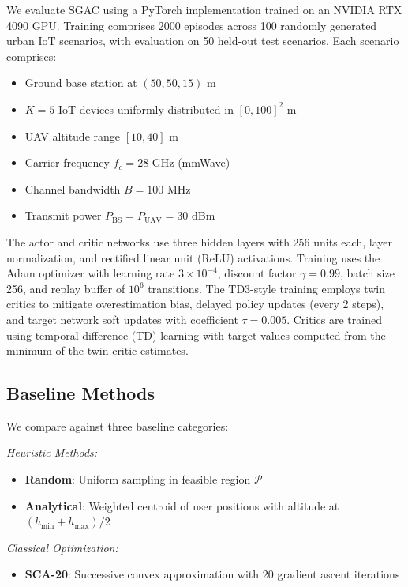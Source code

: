 \documentclass[journal]{IEEEtran}
\begin{document}
We evaluate SGAC using a PyTorch implementation trained on an NVIDIA RTX 4090 GPU. Training comprises 2000 episodes across 100 randomly generated urban IoT scenarios, with evaluation on 50 held-out test scenarios. Each scenario comprises:
\begin{itemize}
\item Ground base station at $(50, 50, 15)$ m
\item $K = 5$ IoT devices uniformly distributed in $[0, 100]^2$ m
\item UAV altitude range $[10, 40]$ m
\item Carrier frequency $f_c = 28$ GHz (mmWave)
\item Channel bandwidth $B = 100$ MHz
\item Transmit power $P_{\text{BS}} = P_{\text{UAV}} = 30$ dBm
\end{itemize}

The actor and critic networks use three hidden layers with 256 units each, layer normalization, and rectified linear unit (ReLU) activations. Training uses the Adam optimizer with learning rate $3 \times 10^{-4}$, discount factor $\gamma = 0.99$, batch size 256, and replay buffer of $10^6$ transitions. The TD3-style training employs twin critics to mitigate overestimation bias, delayed policy updates (every 2 steps), and target network soft updates with coefficient $\tau = 0.005$. Critics are trained using temporal difference (TD) learning with target values computed from the minimum of the twin critic estimates.

\subsection{Baseline Methods}

We compare against three baseline categories:

\textit{Heuristic Methods:}
\begin{itemize}
\item \textbf{Random}: Uniform sampling in feasible region $\mathcal{P}$
\item \textbf{Analytical}: Weighted centroid of user positions with altitude at $(h_{\min} + h_{\max})/2$
\end{itemize}

\textit{Classical Optimization:}
\begin{itemize}
\item \textbf{SCA-20}: Successive convex approximation with 20 gradient ascent iterations
\end{itemize}
\end{document}

